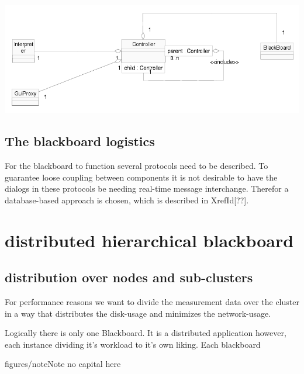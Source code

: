 \documentclass[]{lofar}
\begin{document}
   
{{\includegraphics[]{strategy_interpreter.png}}}

\subsection{The blackboard logistics}
\label{id2721238}\hypertarget{id2721238}{}%



    For the blackboard to function several protocols need to be
    described. To guarantee loose coupling between components it is
    not desirable to have the dialogs in these protocols be needing
    real-time message interchange. Therefor a database-based approach
    is chosen, which is described in
    XrefId[??].

   


\section{distributed hierarchical blackboard}
\label{id2721216}\hypertarget{id2721216}{}%

\subsection{distribution over nodes and sub-clusters}
\label{id2721220}\hypertarget{id2721220}{}%



    For performance reasons we want to divide the measurement data over
    the cluster in a way that distributes the disk-usage and minimizes
    the network-usage.

   



    Logically there is only one Blackboard. It is a distributed
    application however, each instance dividing it's workload to it's
    own liking. Each blackboard 
\begin{admonition}{figures/note}{Note}%
no capital here\end{admonition}
\end{document}
